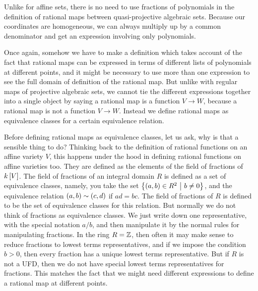 \begin{note*}
Unlike for affine sets, there is no need to use fractions of polynomials in the definition of rational maps between quasi-projective algebraic sets. Because our coordinates are homogeneous, we can always multiply up by a common denominator and get an expression involving only polynomials.
\end{note*}

Once again, somehow we have to make a definition which takes account of the fact that rational maps can be expressed in terms of different lists of polynomials at different points, and it might be necessary to use more than one expression to see the full domain of definition of the rational map. But unlike with regular maps of projective algebraic sets, we cannot tie the different expressions together into a single object by saying a rational map is a function $ V \to W $, because a rational map is not a function $ V \to W $. Instead we define rational maps as equivalence classes for a certain equivalence relation.

\pagebreak

\begin{note*}
Before defining rational maps as equivalence classes, let us ask, why is that a sensible thing to do? Thinking back to the definition of rational functions on an affine variety $ V $, this happens under the hood in defining rational functions on affine varieties too. They are defined as the elements of the field of fractions of $ k\sbr{V} $. The field of fractions of an integral domain $ R $ is defined as a set of equivalence classes, namely, you take the set $ \cbr{\br{a, b} \in R^2 \st b \ne 0} $, and the equivalence relation $ \br{a, b} \sim \br{c, d} $ if $ ad = bc $. The field of fractions of $ R $ is defined to be the set of equivalence classes for this relation. But normally we do not think of fractions as equivalence classes. We just write down one representative, with the special notation $ a / b $, and then manipulate it by the normal rules for manipulating fractions. In the ring $ R = \mathbb{Z} $, then often it may make sense to reduce fractions to lowest terms representatives, and if we impose the condition $ b > 0 $, then every fraction has a unique lowest terms representative. But if $ R $ is not a UFD, then we do not have special lowest terms representatives for fractions. This matches the fact that we might need different expressions to define a rational map at different points.
\end{note*}

